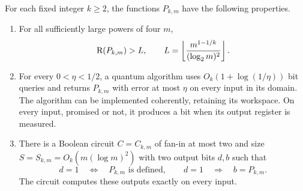 \begin{lemma}\label{lem:forrelation}
For each fixed integer $k\geq2$, the functions $P_{k,m}$ have the following
properties.
\begin{enumerate}
 \item For all sufficiently large powers of four $m$,
 \begin{equation}\label{eq:L-def}
  \mathrm R(P_{k,m})>L,
  \qquad
  L=\left\lfloor
       \frac{m^{1-1/k}}{(\log_2 m)^2}
     \right\rfloor.
 \end{equation}
 \item For every $0<\eta<1/2$, a quantum algorithm uses
 $O_k(1+\log(1/\eta))$ bit queries and returns $P_{k,m}$ with error at most
 $\eta$ on every input in its domain.  The algorithm can be implemented
 coherently, retaining its workspace.  On every input, promised or not, it
 produces a bit when its output register is measured.
 \item There is a Boolean circuit $C=C_{k,m}$ of fan-in at most two and
 size $S=S_{k,m}=O_k(m(\log m)^2)$ with two output bits $d,b$ such that
 \[
  d=1\quad\Longleftrightarrow\quad P_{k,m}\text{ is defined},
  \qquad d=1\quad\Longrightarrow\quad b=P_{k,m}.
 \]
 The circuit computes these outputs exactly on every input.
\end{enumerate}
\end{lemma}

